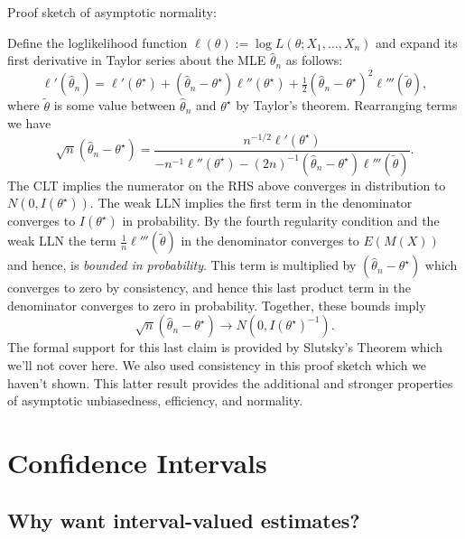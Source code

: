 \documentclass[
]{book}
\begin{document}
Proof sketch of asymptotic normality:

Define the loglikelihood function \(\ell(\theta):=\log L(\theta;X_1, \ldots, X_n)\) and expand its first derivative in Taylor series about the MLE \(\hat\theta_n\) as follows:
\[\ell'(\hat\theta_n) = \ell'(\theta^\star) + (\hat\theta_n - \theta^\star)\ell''(\theta^\star) + \tfrac12(\hat\theta_n - \theta^\star)^2\ell'''(\tilde\theta),\]
where \(\tilde\theta\) is some value between \(\hat\theta_n\) and \(\theta^\star\) by Taylor's theorem. Rearranging terms we have
\[\sqrt{n}(\hat\theta_n - \theta^\star) = \frac{n^{-1/2}\ell'(\theta^\star)}{-n^{-1}\ell''(\theta^\star) - (2n)^{-1}(\hat\theta_n-\theta^\star)\ell'''(\tilde\theta)}.\]
The CLT implies the numerator on the RHS above converges in distribution to \(N(0, I(\theta^\star))\). The weak LLN implies the first term in the denominator converges to \(I(\theta^\star)\) in probability. By the fourth regularity condition and the weak LLN the term \(\tfrac1n \ell'''(\tilde\theta)\) in the denominator converges to \(E(M(X))\) and hence, is \emph{bounded in probability}. This term is multiplied by \((\hat\theta_n - \theta^\star)\) which converges to zero by consistency, and hence this last product term in the denominator converges to zero in probability. Together, these bounds imply
\[\sqrt{n}(\hat\theta_n - \theta^\star)\rightarrow N(0,I(\theta^\star)^{-1}).\]
The formal support for this last claim is provided by Slutsky's Theorem which we'll not cover here. We also used consistency in this proof sketch which we haven't shown. This latter result provides the additional and stronger properties of asymptotic unbiasedness, efficiency, and normality.

\hypertarget{confidence-intervals}{%
\chapter{Confidence Intervals}\label{confidence-intervals}}

\hypertarget{why-want-interval-valued-estimates}{%
\section{Why want interval-valued estimates?}\label{why-want-interval-valued-estimates}}
\end{document}
